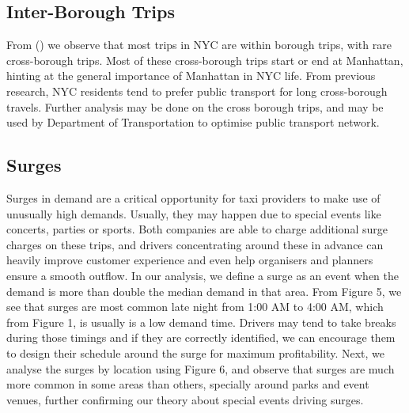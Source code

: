 \documentclass[11pt]{article}
\begin{document}
\subsection{Inter-Borough Trips}
From () we observe that most trips in NYC are within borough trips, with rare cross-borough trips. Most of these cross-borough trips start or end at Manhattan, hinting at the general importance of  Manhattan in NYC life. From previous research, NYC residents tend to prefer public transport for long cross-borough travels\cite{communingpdf}. Further analysis may be done on the cross borough trips, and may be used by Department of Transportation to optimise public transport network.

\subsection{Surges}
Surges in demand are a critical opportunity for taxi providers to make use of unusually high demands. Usually, they may happen due to special events like concerts, parties or sports. Both companies are able to charge additional surge charges on these trips, and drivers concentrating around these in advance can heavily improve customer experience and even help organisers and planners ensure a smooth outflow\cite{uberpricing, lyftpricing}. In our analysis, we define a surge as an event when the demand is more than double the median demand in that area. From Figure 5, we see that surges are most common late night from 1:00 AM to 4:00 AM, which from Figure 1, is usually is a low demand time. Drivers may tend to take breaks during those timings and if they are correctly identified, we can encourage them to design their schedule around the surge for maximum profitability. Next, we analyse the surges by location using Figure 6, and observe that surges are much more common in some areas than others, specially around parks and event venues, further confirming our theory about special events driving surges.
\end{document}
